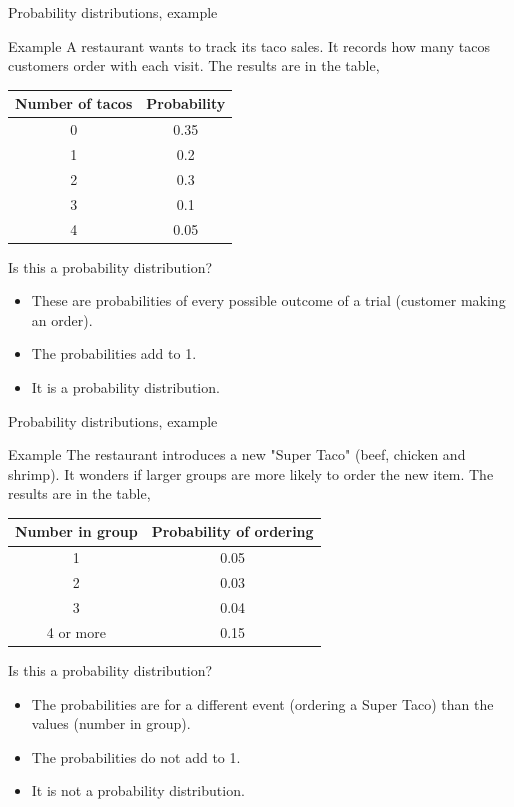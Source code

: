 \documentclass[xcolor=table, handout]{beamer}
\begin{document}
\begin{frame}{Probability distributions, example}
\begin{exampleblock}{Example}
A restaurant wants to track its taco sales. It records how many tacos customers order with each visit. The results are in the table,\\
\medskip
{\centering \renewcommand{\arraystretch}{1}
\begin{tabular}{c | c}
Number of tacos & Probability\\
\hline
0 & 0.35\\
1 & 0.2\\
2 & 0.3\\
3 & 0.1\\
4 & 0.05
\end{tabular}\par
\renewcommand{\arraystretch}{1.5}}
\medskip
Is this a probability distribution?
\begin{itemize}
\pause\item These are probabilities of every possible outcome of a trial (customer making an order).
\pause\item The probabilities add to 1.
\pause\item It is a probability distribution.
\end{itemize}
\end{exampleblock}
\end{frame}

\begin{frame}{Probability distributions, example}
\begin{exampleblock}{Example}
The restaurant introduces a new "Super Taco" (beef, chicken and shrimp). It wonders if larger groups are more likely to order the new item. The results are in the table,\\
\medskip
{\centering \renewcommand{\arraystretch}{1}
\begin{tabular}{c | c}
Number in group & Probability of ordering \\
\hline
1 & 0.05\\
2 & 0.03\\
3 & 0.04\\
4 or more & 0.15
\end{tabular}\par
\renewcommand{\arraystretch}{1.5}}
\medskip
Is this a probability distribution?
\begin{itemize}
\pause\item The probabilities are for a different event (ordering a Super Taco) than the values (number in group). 
\pause\item The probabilities do not add to 1.
\pause\item It is not a probability distribution.
\end{itemize}
\end{exampleblock}
\end{frame}
\end{document}
